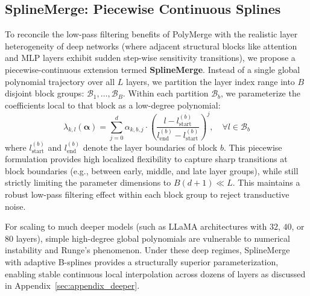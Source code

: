 \subsection{SplineMerge: Piecewise Continuous Splines}
\label{sec:splinemerge_method}
To reconcile the low-pass filtering benefits of PolyMerge with the realistic layer heterogeneity of deep networks (where adjacent structural blocks like attention and MLP layers exhibit sudden step-wise sensitivity transitions), we propose a piecewise-continuous extension termed \textbf{SplineMerge}. Instead of a single global polynomial trajectory over all $L$ layers, we partition the layer index range into $B$ disjoint block groups: $\mathcal{B}_1, \dots, \mathcal{B}_B$. Within each partition $\mathcal{B}_b$, we parameterize the coefficients local to that block as a low-degree polynomial:
\begin{equation}
\lambda_{k, l}(\boldsymbol{\alpha}) = \sum_{j=0}^d \alpha_{k, b, j} \cdot \left( \frac{l - l_{\text{start}}^{(b)}}{l_{\text{end}}^{(b)} - l_{\text{start}}^{(b)}} \right)^j, \quad \forall l \in \mathcal{B}_b
\end{equation}
where $l_{\text{start}}^{(b)}$ and $l_{\text{end}}^{(b)}$ denote the layer boundaries of block $b$. This piecewise formulation provides high localized flexibility to capture sharp transitions at block boundaries (e.g., between early, middle, and late layer groups), while still strictly limiting the parameter dimensions to $B(d+1) \ll L$. This maintains a robust low-pass filtering effect within each block group to reject transductive noise.

For scaling to much deeper models (such as LLaMA architectures with $32$, $40$, or $80$ layers), simple high-degree global polynomials are vulnerable to numerical instability and Runge's phenomenon. Under these deep regimes, SplineMerge with adaptive B-splines provides a structurally superior parameterization, enabling stable continuous local interpolation across dozens of layers as discussed in Appendix~\ref{sec:appendix_deeper}.

